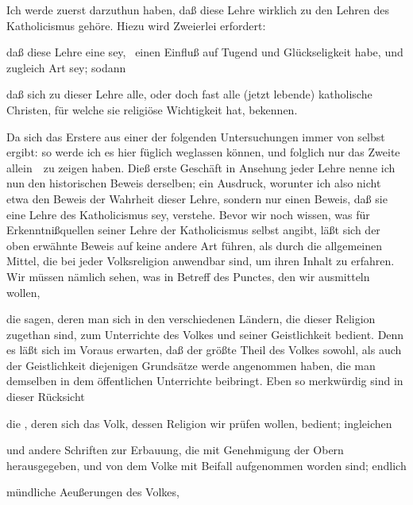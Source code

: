 \begin{aufza}
\begin{aufzb}
\item Ich werde zuerst darzuthun haben, daß diese Lehre wirklich zu den Lehren des Katholicismus gehöre. Hiezu wird Zweierlei erfordert:
\begin{aufzc}
\item daß diese Lehre eine  sey, \dh\ einen Einfluß auf Tugend und Glückseligkeit habe, und zugleich  Art sey; sodann
\item daß sich zu dieser Lehre alle, oder doch fast alle (jetzt lebende) katholische Christen, für welche sie religiöse Wichtigkeit hat, bekennen.
\end{aufzc}
Da sich das Erstere aus einer der folgenden Untersuchungen immer von selbst ergibt: so werde ich es hier füglich weglassen können, und folglich nur das Zweite allein~\ zu zeigen haben. Dieß erste Geschäft in Ansehung jeder Lehre nenne ich nun den historischen Beweis derselben; ein Ausdruck, worunter ich also nicht etwa den Beweis der Wahrheit dieser Lehre, sondern nur einen Beweis, daß sie eine Lehre des Katholicismus sey, verstehe. Bevor wir noch wissen, was für Erkenntnißquellen seiner Lehre der Katholicismus selbst angibt, läßt sich der oben erwähnte Beweis auf keine andere Art führen, als durch die allgemeinen Mittel, die bei jeder Volksreligion anwendbar sind, um ihren Inhalt zu erfahren. Wir müssen nämlich sehen, was in Betreff des Punctes, den wir ausmitteln wollen,
\begin{aufzc}
\item die  sagen, deren man sich in den verschiedenen Ländern, die dieser Religion zugethan sind, zum Unterrichte des Volkes und seiner Geistlichkeit bedient. Denn es läßt sich im Voraus erwarten, daß der größte Theil des Volkes sowohl, als auch der Geistlichkeit diejenigen Grundsätze werde angenommen haben, die man demselben in dem öffentlichen Unterrichte beibringt. Eben so merkwürdig sind in dieser Rücksicht
\item die , deren sich das Volk, dessen Religion wir prüfen wollen, bedient; ingleichen
\item {} und andere Schriften zur Erbauung, die mit Genehmigung der Obern herausgegeben, und von dem Volke mit Beifall aufgenommen worden sind; endlich
\item mündliche Aeußerungen des Volkes, \usw
\end{aufzc}

\end{aufzb}
\end{aufza}
